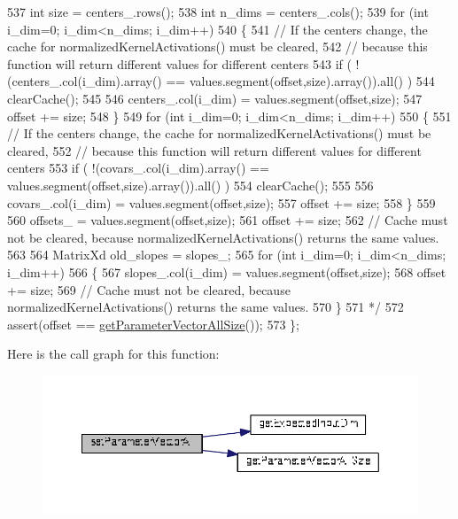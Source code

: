 \begin{DoxyCode}
537 \textcolor{comment}{  int size = centers\_.rows();}
538 \textcolor{comment}{  int n\_dims = centers\_.cols();}
539 \textcolor{comment}{  for (int i\_dim=0; i\_dim<n\_dims; i\_dim++)}
540 \textcolor{comment}{  \{}
541 \textcolor{comment}{    // If the centers change, the cache for normalizedKernelActivations() must be cleared,}
542 \textcolor{comment}{    // because this function will return different values for different centers}
543 \textcolor{comment}{    if ( !(centers\_.col(i\_dim).array() == values.segment(offset,size).array()).all() )}
544 \textcolor{comment}{      clearCache();}
545 \textcolor{comment}{    }
546 \textcolor{comment}{    centers\_.col(i\_dim) = values.segment(offset,size);}
547 \textcolor{comment}{    offset += size;}
548 \textcolor{comment}{  \}}
549 \textcolor{comment}{  for (int i\_dim=0; i\_dim<n\_dims; i\_dim++)}
550 \textcolor{comment}{  \{}
551 \textcolor{comment}{    // If the centers change, the cache for normalizedKernelActivations() must be cleared,}
552 \textcolor{comment}{    // because this function will return different values for different centers}
553 \textcolor{comment}{    if ( !(covars\_.col(i\_dim).array() == values.segment(offset,size).array()).all() )}
554 \textcolor{comment}{      clearCache();}
555 \textcolor{comment}{    }
556 \textcolor{comment}{    covars\_.col(i\_dim) = values.segment(offset,size);}
557 \textcolor{comment}{    offset += size;}
558 \textcolor{comment}{  \}}
559 \textcolor{comment}{}
560 \textcolor{comment}{  offsets\_ = values.segment(offset,size);}
561 \textcolor{comment}{  offset += size;}
562 \textcolor{comment}{  // Cache must not be cleared, because normalizedKernelActivations() returns the same values.}
563 \textcolor{comment}{}
564 \textcolor{comment}{  MatrixXd old\_slopes = slopes\_;}
565 \textcolor{comment}{  for (int i\_dim=0; i\_dim<n\_dims; i\_dim++)}
566 \textcolor{comment}{  \{}
567 \textcolor{comment}{    slopes\_.col(i\_dim) = values.segment(offset,size);}
568 \textcolor{comment}{    offset += size;}
569 \textcolor{comment}{    // Cache must not be cleared, because normalizedKernelActivations() returns the same values.}
570 \textcolor{comment}{  \}}
571 \textcolor{comment}{*/}
572   assert(offset == \hyperlink{classDmpBbo_1_1UnifiedModel_ab24d2485b3b795b516f4844f225100eb}{getParameterVectorAllSize}());   
573 \};
\end{DoxyCode}


Here is the call graph for this function\+:
\nopagebreak
\begin{figure}[H]
\begin{center}
\leavevmode
\includegraphics[width=350pt]{classDmpBbo_1_1UnifiedModel_a9d3c8f22e8237a805af4935a647e5a50_cgraph}
\end{center}
\end{figure}


